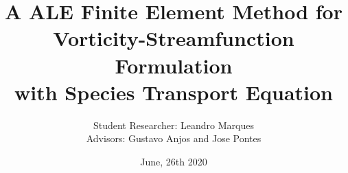 

\usepackage[T1]{fontenc} %
\usepackage[utf8]{inputenc} %
\usepackage[portuguese]{babel} %
\usepackage{cite} %
\usepackage{epsf,epsfig,psfig} %
\usepackage{fancyhdr} %
\usepackage{setspace} %
\usepackage{float} %
\usepackage{makeidx} %
\usepackage{amsmath,amssymb,bm,amsbsy} %
\usepackage{mathtools} %
\usepackage{lipsum} %
\usepackage{tikz,tikz-3dplot,pgfplots}
\usetikzlibrary{patterns}
\usepackage{relsize}
\usetikzlibrary{shapes,arrows,arrows.meta,matrix}
\usepackage{ragged2e}

\justifying \title[]{A ALE Finite Element Method for \\ Vorticity-Streamfunction Formulation \\ with Species Transport Equation}
\subtitle{}
\author{\vspace{0.5cm} Student Researcher: Leandro Marques \\ Advisors: Gustavo Anjos and Jose Pontes}

\date{June, 26th 2020}


\beamertemplatenavigationsymbolsempty 


